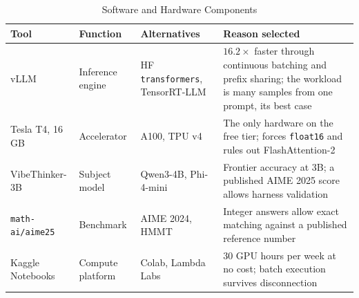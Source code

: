 \documentclass[conference]{IEEEtran}
\newif\ifdraft
\newcommand{\writehere}[2]{%
  \ifdraft
    {\color{orange!75!black}\small\textbf{[WRITE: #1]}\itshape\ #2\par}
    \medskip
  \fi}
\begin{document}
\writehere{2 paragraphs}{
First: the model and the dataset. VibeThinker-3B, weights never modified, and the
30 problem AIME 2025 set. Explain the substitution honestly because a reader will
ask: AIME 2026 has no public dataset, so AIME 2025 was used, and this is an
advantage since the paper reports 91.4 for AIME 2025 and it allows the harness to
be validated. Integer answers between 0 and 999 mean exact matching with no judge
model.
\\
Second: the engine. HuggingFace transformers gave 15.2 tokens per second, which
projected to over a hundred GPU hours and was not feasible. vLLM \cite{vllm}
raised it to 246.4 at $K{=}32$, a 16.2 times improvement, through continuous
batching and prefix sharing. Point at Table \ref{tab:tools}.}

\begin{table}[t]
\caption{Software and Hardware Components}
\label{tab:tools}
\centering
\footnotesize
\begin{tabular}{@{}L{2.4cm}L{3.4cm}L{3.4cm}L{6.4cm}@{}}
\toprule
\textbf{Tool} & \textbf{Function} & \textbf{Alternatives} & \textbf{Reason selected} \\
\midrule
vLLM & Inference engine & HF \texttt{transformers}, TensorRT-LLM &
$16.2\times$ faster through continuous batching and prefix sharing; the workload
is many samples from one prompt, its best case \\
\addlinespace
Tesla T4, 16\,GB & Accelerator & A100, TPU v4 & The only hardware on the free
tier; forces \texttt{float16} and rules out FlashAttention-2 \\
\addlinespace
VibeThinker-3B & Subject model & Qwen3-4B, Phi-4-mini & Frontier accuracy at 3B; a
published AIME 2025 score allows harness validation \\
\addlinespace
\texttt{math-ai/aime25} & Benchmark & AIME 2024, HMMT & Integer answers allow
exact matching against a published reference number \\
\addlinespace
Kaggle Notebooks & Compute platform & Colab, Lambda Labs & 30 GPU hours per week
at no cost; batch execution survives disconnection \\
\bottomrule
\end{tabular}
\end{table}

\writehere{1 paragraph on the T4 constraints}{
Three consequences of the card being Turing, compute capability 7.5.
FlashAttention-2 needs 8.0 or above so vLLM falls back to a Triton backend.
bfloat16 is unsupported so float16 is mandatory. And the key value cache holds
192,272 tokens at 90 percent utilisation, so concurrency is that divided by the
context window as in (\ref{eq:conc}), which is why a 32k context sustained 60 to
71 tokens per second while an 8k context sustained 246.}
\end{document}
